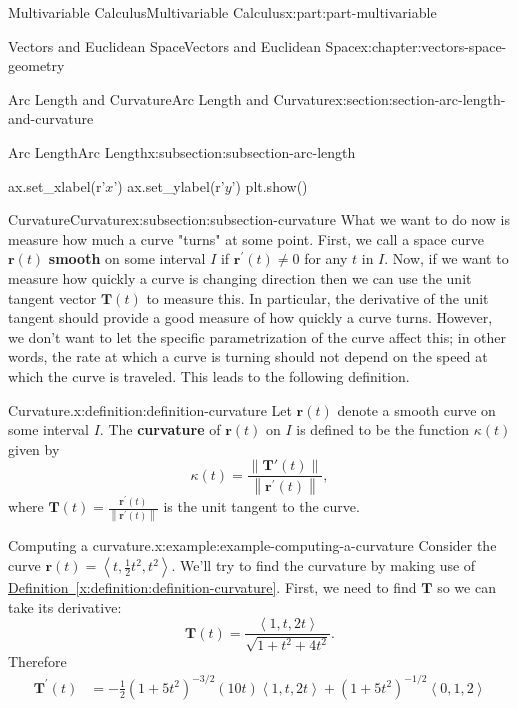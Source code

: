 \documentclass[twoside,10pt,]{book}
\newcommand{\xreffont}{\relax}
\newcommand{\terminology}[1]{\textbf{#1}}
\numberwithin{equation}{part}
\newcommand{\norm}[1]{\left\| #1 \right\|}
\newcommand{\dotprod}[1]{\left\langle #1 \right\rangle}
\begin{document}
\begin{partptx}{Multivariable Calculus}{}{Multivariable Calculus}{}{}{x:part:part-multivariable}
\begin{chapterptx}{Vectors and Euclidean Space}{}{Vectors and Euclidean Space}{}{}{x:chapter:vectors-space-geometry}
\begin{sectionptx}{Arc Length and Curvature}{}{Arc Length and Curvature}{}{}{x:section:section-arc-length-and-curvature}
\begin{subsectionptx}{Arc Length}{}{Arc Length}{}{}{x:subsection:subsection-arc-length}
\begin{sageinput}
ax.set_xlabel(r'$x$')
ax.set_ylabel(r'$y$')
plt.show()
\end{sageinput}
\end{subsectionptx}
%
%
\typeout{************************************************}
\typeout{************************************************}
%
\begin{subsectionptx}{Curvature}{}{Curvature}{}{}{x:subsection:subsection-curvature}
What we want to do now is measure how much a curve "turns" at some point. First, we call a space curve \(\mathbf{r}(t)\) \terminology{smooth} on some interval \(I\) if \(\mathbf{r}^\prime(t)\neq0\) for any \(t\) in \(I\). Now, if we want to measure how quickly a curve is changing direction then we can use the unit tangent vector \(\mathbf{T}(t)\) to measure this. In particular, the derivative of the unit tangent should provide a good measure of how quickly a curve turns. However, we don't want to let the specific parametrization of the curve affect this; in other words, the rate at which a curve is turning should not depend on the speed at which the curve is traveled. This leads to the following definition.%
\begin{definition}{Curvature.}{x:definition:definition-curvature}%
%
Let \(\mathbf{r}(t)\) denote a smooth curve on some interval \(I\). The \terminology{curvature} of \(\mathbf{r}(t)\) on \(I\) is defined to be the function \(\kappa(t)\) given by%
%
\begin{equation*}
\kappa(t) = \frac{\norm{\mathbf{T}'(t)}}{\norm{\mathbf{r}^\prime(t)}},
\end{equation*}
where \(\mathbf{T}(t) = \frac{\mathbf{r}^\prime(t)}{\norm{\mathbf{r}^\prime(t)}}\) is the unit tangent to the curve.%
\end{definition}
\begin{example}{Computing a curvature.}{x:example:example-computing-a-curvature}%
Consider the curve \(\mathbf{r}(t) = \dotprod{t,\frac{1}{2}t^{2},t^{2}}.\) We'll try to find the curvature by making use of \hyperref[x:definition:definition-curvature]{Definition~{\xreffont\ref{x:definition:definition-curvature}}}. First, we need to find \(\mathbf{T}\) so we can take its derivative:%
%
\begin{equation*}
\mathbf{T}(t) = \frac{\dotprod{1,t,2t}}{\sqrt{1+t^{2}+4t^{2}}}.
\end{equation*}
Therefore%
%
\begin{align*}
\mathbf{T}^\prime(t) & = -\frac{1}{2}(1+5t^{2})^{-3/2}(10t)\dotprod{1,t,2t} + (1+5t^{2})^{-1/2}\dotprod{0,1,2} \\

\end{align*}
\end{example}
\end{subsectionptx}
\end{sectionptx}
\end{chapterptx}
\end{partptx}
\end{document}
